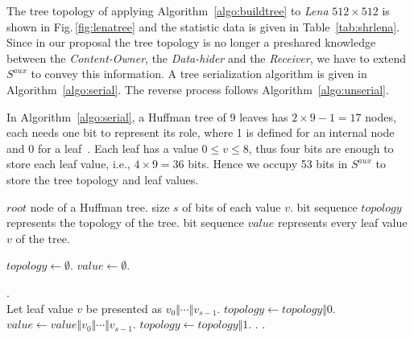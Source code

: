 The tree topology of applying Algorithm~\ref{algo:buildtree} to \emph{Lena} $512 \times 512$ is shown in Fig.\,\ref{fig:lenatree} and the statistic data is given in Table~\ref{tab:shrlena}. 
Since in our proposal the tree topology is no longer a preshared knowledge between the \emph{Content-Owner}, the \emph{Data-hider} and the \emph{Receiver}, we have to extend $S^{aux}$ to convey this information. 
A tree serialization algorithm is given in Algorithm~\ref{algo:serial}. The reverse process follows Algorithm~\ref{algo:unserial}.

In Algorithm~\ref{algo:serial}, a Huffman tree of 9 leaves has $2 \times 9 -1 = 17$ nodes, each needs one bit to represent its role, where 1 is defined for an internal node and 0 for a leaf~\cite{Pu2006}. 
Each leaf has a value $0 \leq v \leq 8$, thus four bits are enough to store each leaf value, i.e., $4 \times 9 = 36$ bits. 
Hence we occupy 53 bits in $S^{aux}$ to store the tree topology and leaf values.

\begin{algorithm}
	\caption{Tree Serialization.}
	\label{algo:serial}
	
	\begin{algorithmic}[1]
		\Require $root$ node of a Huffman tree.
		\Require size $s$ of bits of each value $v$.
		\Ensure  bit sequence $topology$ represents the topology of the tree.
		\Ensure  bit sequence $value$ represents every leaf value $v$ of the tree.
		
		\State $topology \gets \emptyset$.
		\State $value    \gets \emptyset$.
		
		\State {}.
		\\
		
		\State 		Let leaf value $v$ be presented as $v_0 \Vert \cdots \Vert v_{s-1}$.
		\State 		$topology \gets topology \Vert 0$.
		\State 		$value \gets value \Vert v_0 \Vert \cdots \Vert v_{s-1}$.
		\Else
		\State		 $topology \gets topology \Vert 1$.
		\State 		{}.
		\State 		{}.
		\EndIf
		\EndProcedure
	\end{algorithmic}
\end{algorithm}

